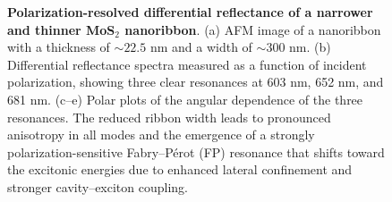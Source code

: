 \documentclass[journal=jacsnano,manuscript=article]{achemso}
\begin{document}
\begin{suppinfo}
\begin{itemize}
\begin{figure}
    \caption{\textbf{Polarization-resolved differential reflectance of a narrower and thinner MoS$_2$ nanoribbon}. (a) AFM image of a nanoribbon with a thickness of $\sim22.5$ nm and a width of $\sim300$ nm. (b) Differential reflectance spectra measured as a function of incident polarization, showing three clear resonances at 603 nm, 652 nm, and 681 nm. (c–e) Polar plots of the angular dependence of the three resonances. The reduced ribbon width leads to pronounced anisotropy in all modes and the emergence of a strongly polarization-sensitive Fabry–Pérot (FP) resonance that shifts toward the excitonic energies due to enhanced lateral confinement and stronger cavity–exciton coupling.} 
\label{fig:si_5_width_dependent_anisotropy_narrower}
\end{figure}
\newpage

\end{itemize}
\end{suppinfo}
\newpage 
\end{document}
